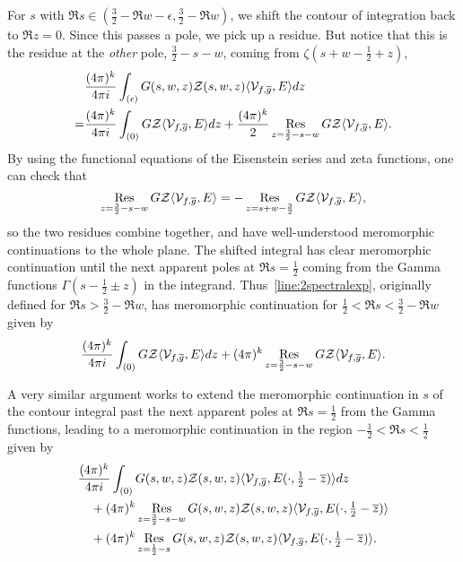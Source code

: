 For $s$ with $\Re s \in (\frac{3}{2} - \Re w - \epsilon, \frac{3}{2} - \Re w)$, we shift
the contour of integration back to $\Re z = 0$.
Since this passes a pole, we pick up a residue.
But notice that this is the residue at the \emph{other} pole, $\tfrac{3}{2} - s - w$,
coming from $\zeta(s + w - \tfrac{1}{2} + z)$,
\begin{align}\label{eq:FEsecondpart}
  &\frac{(4\pi)^k}{4\pi i} \int_{(\epsilon)}G(s, w, z) \mathcal{Z}(s,w,z) \langle
  \mathcal{V}_{f,\overline{g} }, E\rangle dz  \\
  =&\frac{(4\pi)^k}{4\pi i}\int_{(0)} G \mathcal{Z} \langle \mathcal{V}_{f,\overline{g} },
  E \rangle dz + \frac{(4\pi)^k}{2}\operatorname*{Res}_{z = \frac{3}{2} - s - w} G \mathcal{Z}  \langle
  \mathcal{V}_{f,\overline{g} }, E\rangle \nonumber.
\end{align}
By using the functional equations of the Eisenstein series and zeta functions, one can
check that
\begin{equation}
  \operatorname*{Res}_{z = \frac{3}{2} - s - w} G \mathcal{Z} \langle \mathcal{V}_{f,\overline{g} },
  E\rangle = - \operatorname*{Res}_{z = s + w -  \frac{3}{2}} G \mathcal{Z}
  \langle\mathcal{V}_{f,\overline{g} }, E\rangle,
\end{equation}
so the two residues combine together, and have well-understood meromorphic continuations
to the whole plane.
The shifted integral has clear meromorphic continuation until the next apparent poles at
$\Re s = \tfrac{1}{2}$ coming from the Gamma functions $\Gamma(s - \tfrac{1}{2} \pm z)$ in
the integrand.
Thus~\eqref{line:2spectralexp}, originally defined for $\Re s > \frac{3}{2} - \Re w$, has
meromorphic continuation for $\frac{1}{2} < \Re s < \frac{3}{2} - \Re w$ given by
\begin{equation}
  \frac{(4\pi)^k}{4\pi i}\int_{(0)}G \mathcal{Z} \langle \mathcal{V}_{f,\overline{g} },
  E\rangle dz + (4\pi)^k \operatorname*{Res}_{z = \frac{3}{2} - s - w} G \mathcal{Z} \langle
\mathcal{V}_{f,\overline{g} }, E\rangle.
\end{equation}


A very similar argument works to extend the meromorphic continuation in $s$ of the contour
integral past the next apparent poles at $\Re s  = \frac{1}{2}$ from the Gamma functions,
leading to a meromorphic continuation in the region $-\frac{1}{2}< \Re s < \frac{1}{2}$
given by
\begin{align}\label{eq:fullcontinuation}
  &\frac{(4\pi)^k}{4\pi i}\int_{(0)}G(s, w, z)\mathcal{Z}(s,w,z)\langle
\mathcal{V}_{f,\overline{g} }, E(\cdot, \tfrac{1}{2} - \overline{z})\rangle dz \\
  &\quad+ (4\pi)^k \operatorname*{Res}_{z = \frac{3}{2} - s - w}  G(s, w, z) \mathcal{Z}(s,w,z) \langle
  \mathcal{V}_{f,\overline{g} }, E(\cdot, \tfrac{1}{2} - \overline{z})\rangle
  \label{line:firstresidual} \\
  &\quad+ (4\pi)^k \operatorname*{Res}_{z = \frac{1}{2} - s} G(s, w, z) \mathcal{Z}(s,w,z) \langle
\mathcal{V}_{f,\overline{g} }, E(\cdot, \tfrac{1}{2} -\overline{z})\rangle.
\label{line:secondresidual}
\end{align}


